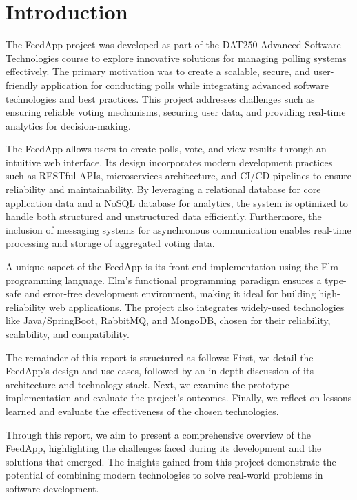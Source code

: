 \section{Introduction}
\label{sec:introduction}

The FeedApp project was developed as part of the DAT250 Advanced Software Technologies course to explore innovative solutions for managing polling systems effectively. The primary motivation was to create a scalable, secure, and user-friendly application for conducting polls while integrating advanced software technologies and best practices. This project addresses challenges such as ensuring reliable voting mechanisms, securing user data, and providing real-time analytics for decision-making.

The FeedApp allows users to create polls, vote, and view results through an intuitive web interface. Its design incorporates modern development practices such as RESTful APIs, microservices architecture, and CI/CD pipelines to ensure reliability and maintainability. By leveraging a relational database for core application data and a NoSQL database for analytics, the system is optimized to handle both structured and unstructured data efficiently. Furthermore, the inclusion of messaging systems for asynchronous communication enables real-time processing and storage of aggregated voting data.

A unique aspect of the FeedApp is its front-end implementation using the Elm programming language. Elm’s functional programming paradigm ensures a type-safe and error-free development environment, making it ideal for building high-reliability web applications. The project also integrates widely-used technologies like Java/SpringBoot, RabbitMQ, and MongoDB, chosen for their reliability, scalability, and compatibility.

The remainder of this report is structured as follows: First, we detail the FeedApp’s design and use cases, followed by an in-depth discussion of its architecture and technology stack. Next, we examine the prototype implementation and evaluate the project’s outcomes. Finally, we reflect on lessons learned and evaluate the effectiveness of the chosen technologies.

Through this report, we aim to present a comprehensive overview of the FeedApp, highlighting the challenges faced during its development and the solutions that emerged. The insights gained from this project demonstrate the potential of combining modern technologies to solve real-world problems in software development.

